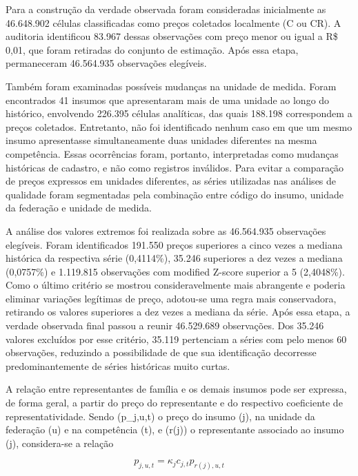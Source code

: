 Para a construção da verdade observada foram consideradas inicialmente as 46.648.902 
células classificadas como preços coletados localmente (C ou CR). A auditoria 
identificou 83.967 dessas observações com preço menor ou igual a R\$ 0,01, que foram 
retiradas do conjunto de estimação. Após essa etapa, permaneceram 46.564.935 observações 
elegíveis.

Também foram examinadas possíveis mudanças na unidade de medida. Foram encontrados 41 
insumos que apresentaram mais de uma unidade ao longo do histórico, envolvendo 226.395 
células analíticas, das quais 188.198 correspondem a preços coletados. Entretanto, não 
foi identificado nenhum caso em que um mesmo insumo apresentasse simultaneamente duas 
unidades diferentes na mesma competência. Essas ocorrências foram, portanto, 
interpretadas como mudanças históricas de cadastro, e não como registros inválidos. 
Para evitar a comparação de preços expressos em unidades diferentes, as séries 
utilizadas nas análises de qualidade foram segmentadas pela combinação entre código do 
insumo, unidade da federação e unidade de medida.

A análise dos valores extremos foi realizada sobre as 46.564.935 observações elegíveis. 
Foram identificados 191.550 preços superiores a cinco vezes a mediana histórica da 
respectiva série (0,4114\%), 35.246 superiores a dez vezes a mediana (0,0757\%) e 
1.119.815 observações com modified Z-score superior a 5 (2,4048\%). Como o último 
critério se mostrou consideravelmente mais abrangente e poderia eliminar variações 
legítimas de preço, adotou-se uma regra mais conservadora, retirando os valores 
superiores a dez vezes a mediana da série. Após essa etapa, a verdade observada 
final passou a reunir 46.529.689 observações. Dos 35.246 valores excluídos por 
esse critério, 35.119 pertenciam a séries com pelo menos 60 observações, reduzindo a 
possibilidade de que sua identificação decorresse predominantemente de séries históricas 
muito curtas.

A relação entre representantes de família e os demais insumos pode ser expressa, de 
forma geral, a partir do preço do representante e do respectivo coeficiente de 
representatividade. Sendo (p_{j,u,t}) o preço do insumo (j), na unidade da federação 
(u) e na competência (t), e (r(j)) o representante associado ao insumo (j), 
considera-se a relação


\begin{equation} p_{j,u,t} = \kappa_j c_{j,t} p_{r(j),u,t} \end{equation}


